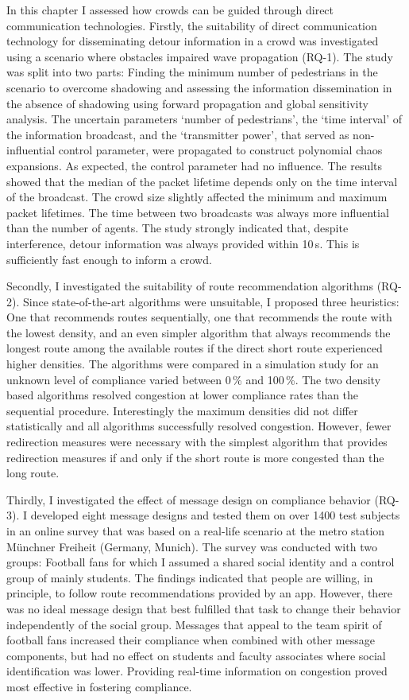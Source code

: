 In this chapter I assessed how crowds can be guided through direct communication technologies. 
Firstly, the suitability of direct communication technology for disseminating detour information in a crowd was investigated using a scenario where obstacles impaired wave propagation (RQ-1). The study was split into two parts: Finding the minimum number of pedestrians in the scenario to overcome shadowing and assessing the  information dissemination in the absence of shadowing using forward propagation and global sensitivity analysis. The uncertain parameters `number of pedestrians', the `time interval' of the information broadcast, and the `transmitter power', that served as non-influential control parameter, were propagated to construct polynomial chaos expansions.  As expected, the control parameter had no influence. The results showed that the median of the packet lifetime depends only on the time interval of the broadcast. The crowd size slightly affected the minimum and maximum packet lifetimes. The time between two broadcasts was always more influential than the number of agents. The study strongly indicated that, despite interference, detour information was always provided within 10\,s. This is sufficiently fast enough to inform a crowd.


Secondly, I investigated the suitability of route recommendation algorithms (RQ-2). Since state-of-the-art algorithms were unsuitable, I proposed three heuristics: One that recommends routes sequentially, one that recommends the route with the lowest density, and an even simpler algorithm that always recommends the longest route among the available routes if the direct short route experienced higher densities. 
The algorithms were compared in a simulation study for an unknown level of compliance varied between 0\,\% and 100\,\%. The two density based algorithms resolved congestion at lower compliance rates than the sequential procedure. Interestingly the maximum densities did not differ statistically and all algorithms successfully resolved congestion. However, fewer redirection measures were necessary with the simplest algorithm that provides redirection measures if and only if the short route is more congested than the long route.  


Thirdly, I investigated the effect of message design on compliance behavior (RQ-3). 
I developed eight message designs and tested them on over 1400 test subjects in an online survey that was based on a real-life scenario  at the metro station Münchner Freiheit (Germany, Munich). The survey was conducted with two groups: Football fans for which I assumed a shared social identity and a control group of mainly students.
The findings indicated that people are willing, in principle, to follow route recommendations provided by an app. However, there was no ideal message design that best fulfilled that task to change their behavior independently of the social group. Messages that appeal to the team spirit of football fans increased their compliance when combined with other message components, but had no effect on students and faculty associates where social identification was lower. Providing real-time information on congestion proved most effective in fostering compliance.

